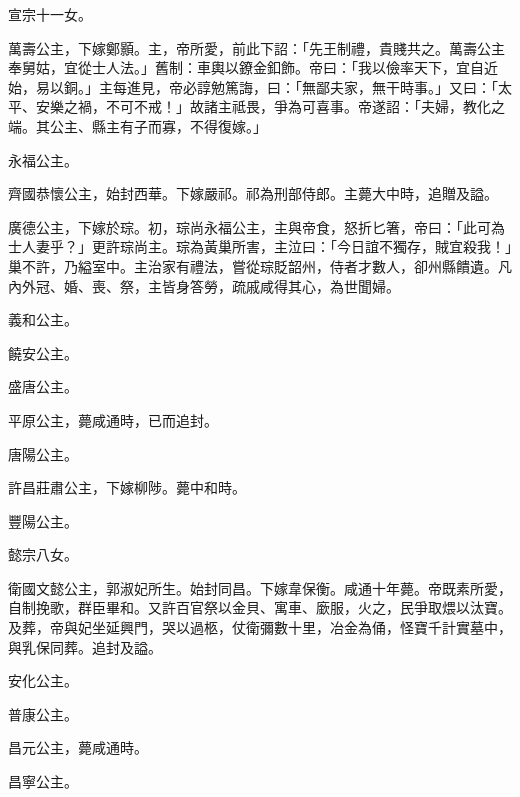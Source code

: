 \begin{pinyinscope}
 宣宗十一女。



 萬壽公主，下嫁鄭顥。主，帝所愛，前此下詔：「先王制禮，貴賤共之。萬壽公主奉舅姑，宜從士人法。」舊制：車輿以鐐金釦飾。帝曰：「我以儉率天下，宜自近始，易以銅。」主每進見，帝必諄勉篤誨，曰：「無鄙夫家，無干時事。」又曰：「太平、安樂之禍，不可不戒！」故諸主祗畏，爭為可喜事。帝遂詔：「夫婦，教化之端。其公主、縣主有子而寡，不得復嫁。」



 永福公主。



 齊國恭懷公主，始封西華。下嫁嚴祁。祁為刑部侍郎。主薨大中時，追贈及謚。



 廣德公主，下嫁於琮。初，琮尚永福公主，主與帝食，怒折匕箸，帝曰：「此可為士人妻乎？」更許琮尚主。琮為黃巢所害，主泣曰：「今日誼不獨存，賊宜殺我！」巢不許，乃縊室中。主治家有禮法，嘗從琮貶韶州，侍者才數人，卻州縣饋遺。凡內外冠、婚、喪、祭，主皆身答勞，疏戚咸得其心，為世聞婦。



 義和公主。



 饒安公主。



 盛唐公主。



 平原公主，薨咸通時，已而追封。



 唐陽公主。



 許昌莊肅公主，下嫁柳陟。薨中和時。



 豐陽公主。



 懿宗八女。



 衛國文懿公主，郭淑妃所生。始封同昌。下嫁韋保衡。咸通十年薨。帝既素所愛，自制挽歌，群臣畢和。又許百官祭以金貝、寓車、廞服，火之，民爭取煨以汰寶。及葬，帝與妃坐延興門，哭以過柩，仗衛彌數十里，冶金為俑，怪寶千計實墓中，與乳保同葬。追封及謚。



 安化公主。



 普康公主。



 昌元公主，薨咸通時。



 昌寧公主。




\end{pinyinscope}

